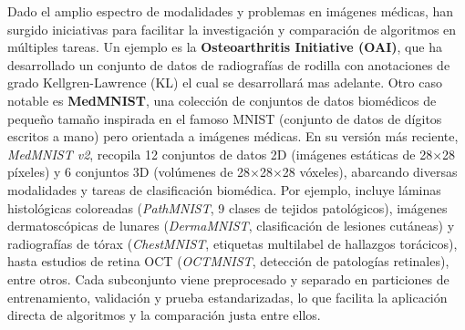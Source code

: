 \documentclass[11pt,spanish,listoffigures,listoftables]{tfgetsinf}
\begin{document}
Dado el amplio espectro de modalidades y problemas en imágenes médicas, han surgido iniciativas para facilitar la investigación y 
comparación de algoritmos en múltiples tareas. Un ejemplo es la \textbf{Osteoarthritis Initiative (OAI)}, que ha desarrollado un conjunto 
de datos de radiografías de rodilla con anotaciones de grado Kellgren-Lawrence (KL) el cual se desarrollará mas adelante. 
Otro caso notable es \textbf{MedMNIST}, una colección de conjuntos de datos biomédicos de pequeño tamaño inspirada 
en el famoso MNIST (conjunto de datos de dígitos escritos a mano) pero orientada a imágenes médicas. En su versión más reciente, 
\textit{MedMNIST v2}, recopila 12 conjuntos de datos 2D (imágenes estáticas de 28$\times$28 píxeles) y 6 conjuntos 3D (volúmenes de 
28$\times$28$\times$28 vóxeles), abarcando diversas modalidades y tareas de clasificación biomédica. Por ejemplo, incluye láminas 
histológicas coloreadas (\textit{PathMNIST}, 9 clases de tejidos patológicos), imágenes dermatoscópicas de lunares (\textit{DermaMNIST}, 
clasificación de lesiones cutáneas) y radiografías de tórax (\textit{ChestMNIST}, etiquetas multilabel de hallazgos torácicos), 
hasta estudios de retina OCT (\textit{OCTMNIST}, detección de patologías retinales), entre otros. Cada subconjunto viene preprocesado 
y separado en particiones de entrenamiento, validación y prueba estandarizadas, lo que facilita la aplicación directa de algoritmos 
y la comparación justa entre ellos.
\end{document}
